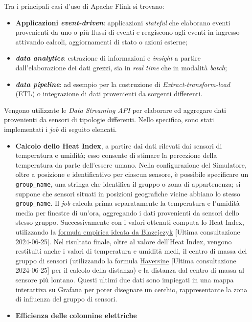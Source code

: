 Tra i principali casi d'uso di Apache Flink si trovano:
\begin{itemize}
	\item \textbf{Applicazioni \textit{event-driven}}: applicazioni \textit{stateful} che elaborano eventi provenienti da uno o più flussi di eventi e reagiscono agli eventi in ingresso attivando calcoli, aggiornamenti di stato o azioni esterne;
	\item \textbf{\textit{data analytics}}: estrazione di informazioni e \textit{insight} a partire dall'elaborazione dei dati grezzi, sia in \textit{real time} che in modalità \textit{batch};
	\item \textbf{\textit{data pipeline}}: ad esempio per la costruzione di \textit{Extract-transform-load} (ETL) o integrazione di dati provenienti da sorgenti differenti.
\end{itemize}

Vengono utilizzate le \textit{Data Streaming API} per elaborare ed aggregare dati provenienti da sensori di tipologie differenti. Nello specifico, sono stati implementati i \textit{job} di seguito elencati.
\begin{itemize}
	\item \textbf{Calcolo dello Heat Index}, a partire dai dati rilevati dai sensori di temperatura e umidità; esso consente di stimare la percezione della temperatura da parte dell'essere umano.
	      Nella configurazione del Simulatore, oltre a posizione e identificativo per ciascun sensore, è possibile specificare un \texttt{group\_name}, una stringa che identifica il gruppo o zona di appartenenza;
	      si suppone che sensori situati in posizioni geografiche vicine abbiano lo stesso \texttt{group\_name}. Il \textit{job} calcola prima separatamente
	      la temperatura e l'umidità media per finestre di un'ora, aggregando i dati provenienti da sensori dello stesso gruppo. Successivamente con i valori ottenuti computa lo Heat Index,
	      utilizzando la \underline{\href{https://www.ncbi.nlm.nih.gov/pmc/articles/PMC3801457/}{formula empirica ideata da Blazejczyk}} [Ultima consultazione 2024-06-25].
	      Nel risultato finale, oltre al valore dell'Heat Index, vengono restituiti anche i valori di temperatura e umidità medi, il centro di massa del gruppo di sensori
	      (utilizzando la formula \underline{\href{https://en.wikipedia.org/wiki/Haversine_formula}{Haversine}} [Ultima consultazione 2024-06-25] per il calcolo della distanza) e la
	      distanza dal centro di massa al sensore più lontano. Questi ultimi due dati sono impiegati in una mappa interattiva su Grafana per poter disegnare un cerchio, rappresentante la zona di influenza del gruppo di sensori.
	\item \textbf{Efficienza delle colonnine elettriche} %

\end{itemize}

